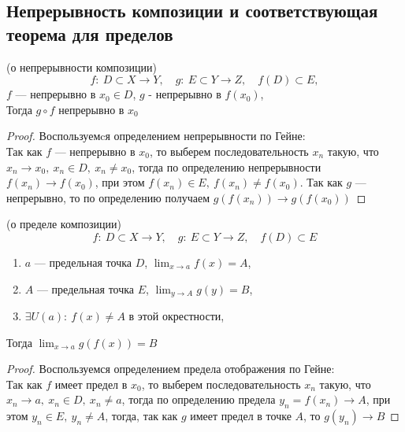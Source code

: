 \newpage
{}
\subsection{Непрерывность композиции и соответствующая теорема для пределов}
\begin{theorem*} (о непрерывности композиции) \\
$$ f: \  D \subset X \rightarrow Y, \quad g: \  E \subset Y \rightarrow Z, \quad f(D) \subset E,$$
$f$ --- непрерывно в $x_0 \in D$, $g$ - непрерывно в $f(x_0)$, \\
Тогда $g \circ f$ непрерывно в $x_0$
\end{theorem*}

\begin{proof}
Воспользуемcя определением непрерывности по Гейне: \\
Так как $f$ --- непрерывно в $x_0$, то выберем последовательность $x_n$ такую, что
$x_n \rightarrow x_0, \  x_n \in D, \  x_n \neq x_0$,
тогда по определению непрерывности
$f(x_n) \rightarrow f(x_0)$, 
при этом 
$f(x_n) \in E, \  f(x_n) \neq f(x_0)$. 
Так как $g$ --- непрерывно, то по определению получаем $g(f(x_n)) \rightarrow g(f(x_0))$
\end{proof}

\begin{theorem*} (о пределе композиции) \\
$$ f: \  D \subset X \rightarrow Y, \quad g: \  E \subset Y \rightarrow Z, \quad  f(D) \subset E $$
\begin{enumerate}
    \item $a$ --- предельная точка $D$, $\lim_{x \rightarrow a}{f(x)} = A$,
    \item $A$ --- предельная точка $E$, $\lim_{y \rightarrow A}{g(y)} = B$,
    \item $\exists U(a): \ f(x) \neq A$ в этой окрестности,
\end{enumerate}
Тогда $\lim_{x \rightarrow a}{g(f(x))} = B$
\end{theorem*}

\begin{proof}
Воспользуемся определением предела отображения по Гейне: \\
Так как $f$ имеет предел в $x_0$, то выберем последовательность $x_n$ такую, что
$
x_n \rightarrow a, \ x_n \in D, \ x_n \neq a
$, тогда по определению предела
$
y_n = f(x_n) \rightarrow A 
$, при этом 
$
y_n \in E, \ 
y_n \neq A
$, тогда, так как $g$ имеет предел в точке $A$, то
$
g(y_n) \rightarrow B 
$
\end{proof}

